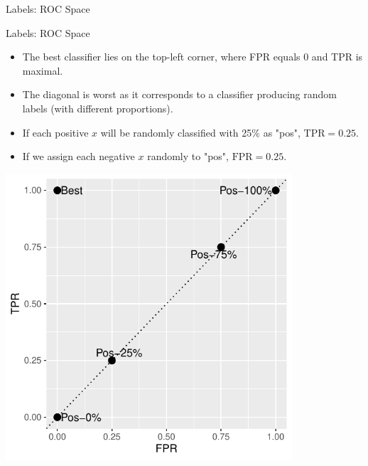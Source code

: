 \documentclass[11pt,compress,t,notes=noshow, xcolor=table]{beamer}
\begin{document}
\begin{vbframe}{Labels: ROC Space}
\end{vbframe}


\begin{vbframe}{Labels: ROC Space}

\begin{itemize}
  \item The best classifier lies on the top-left corner, where FPR equals 0 and
  TPR is maximal.
  \item The diagonal is worst as it corresponds to a classifier producing random
  labels (with different proportions).
\end{itemize}

\lz

\begin{minipage}[c]{0.5\textwidth}
  \begin{itemize}
    \item If each positive $x$ will be randomly classified
    with 25\% as "pos", $\text{TPR} = 0.25$.
    \item If we assign each negative $x$ randomly to "pos", $\text{FPR} = 0.25$.
  \end{itemize}
\end{minipage}%
\begin{minipage}[c]{0.5\textwidth}
  \centering \includegraphics[width=0.8\textwidth]{figure/eval_mclass_roc_sp_2}
\end{minipage}

\end{vbframe}
\end{document}
